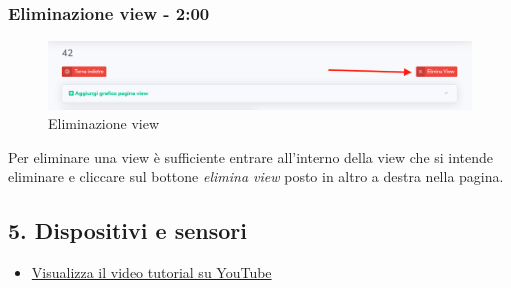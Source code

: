 	\subsubsection{Eliminazione view - 2:00}
		\begin{figure}[H]
		\centering
		\includegraphics[scale=0.450]{res/images/membro/eliminazView.png}
		\caption{Eliminazione view}
		\end{figure}
		Per eliminare una view è sufficiente entrare all'interno della view che si intende eliminare e cliccare sul bottone \textit{elimina view} posto in altro a destra nella pagina.
	

\newpage \subsection{5. Dispositivi e sensori}
	
	\begin{itemize}
		\item \href{https://www.youtube.com/watch?v=PjySMOLCtMA&list=PLPKYjnuIh1FA3b3jn_bwY_ztYzaFn2mIT&index=8}{Visualizza il video tutorial su YouTube} 
	\end{itemize}

